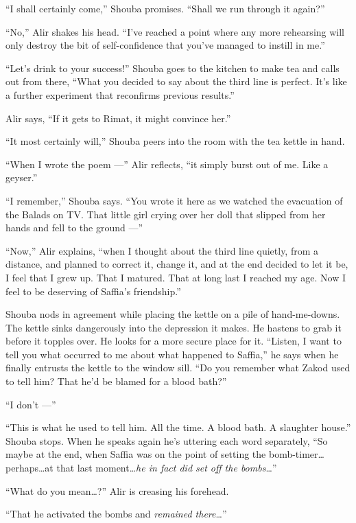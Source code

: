 \documentclass[twoside,11pt,openany]{book}
\begin{document}
``I shall certainly come,'' Shouba promises. ``Shall we run through it
again?''

``No,'' Alir shakes his head. ``I've reached a point where any
more rehearsing will only destroy the bit of self-confidence that you've managed to instill in me.''

``Let's drink to your success!'' Shouba goes to the kitchen to make tea and
calls out from there,
``What you decided to say about the third line is perfect. It's like a further experiment that reconfirms
previous results.''

Alir says, ``If it gets to Rimat, it might convince her.''

``It most certainly will,'' Shouba peers into the room with the tea kettle in hand.

``When I wrote the poem ---'' Alir reflects, ``it simply burst out of me. Like a geyser.''

``I remember,'' Shouba says. ``You wrote it here as we watched the evacuation of
the Balads on TV. That little girl crying over her doll that slipped from her hands and fell to the ground ---''

``Now,'' Alir explains, ``when I thought about the third line quietly, from a
distance, and planned to correct it, change it, and at the end decided to let it be, I feel that I grew up. That I
matured. That at long last I reached my age. Now I feel to be deserving of Saffia's friendship.''

Shouba nods in agreement while placing the kettle on a pile of hand-me-downs. The kettle sinks dangerously into the
depression it makes. He hastens to grab it before it topples over. He looks for a more secure place for it.
``Listen, I want to tell you what occurred to me about what happened to Saffia,'' he says
when he finally entrusts the kettle to the window sill. ``Do you remember what Zakod used to tell him?
That he'd be blamed for a blood bath?''

``I don't ---''

``This is what he used to tell him. All the time. A blood bath. A slaughter house.'' Shouba
stops. When he speaks again he's uttering each word separately, ``So maybe at the end, when Saffia was
on the point of setting the bomb-timer{\ldots}perhaps{\ldots}at that last moment{\ldots}\textit{he in fact did set off
the bombs}{\ldots}''

``What do you mean{\ldots}?'' Alir is creasing his forehead.

``That he activated the bombs and \textit{remained there}{\ldots}''
\end{document}
